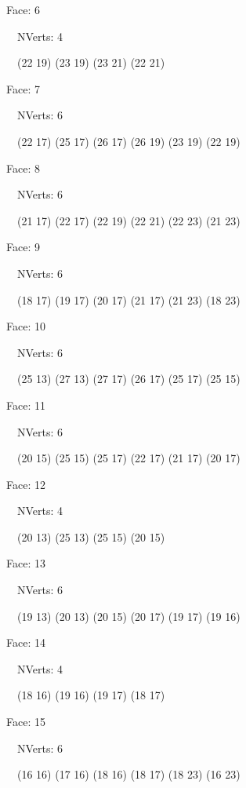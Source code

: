 \documentclass{article}
\begin{document}
{\footnotesize 

Face: 6

\   \    NVerts: 4

 \   \   (22 19) (23 19) (23 21) (22 21)}

{\footnotesize 

Face: 7

\   \    NVerts: 6

 \   \   (22 17) (25 17) (26 17) (26 19) (23 19) (22 19)}

{\footnotesize 

Face: 8

\   \    NVerts: 6

 \   \   (21 17) (22 17) (22 19) (22 21) (22 23) (21 23)}

{\footnotesize 

Face: 9

\   \    NVerts: 6

 \   \   (18 17) (19 17) (20 17) (21 17) (21 23) (18 23)}

{\footnotesize 

Face: 10

\   \    NVerts: 6

 \   \   (25 13) (27 13) (27 17) (26 17) (25 17) (25 15)}

{\footnotesize 

Face: 11

\   \    NVerts: 6

 \   \   (20 15) (25 15) (25 17) (22 17) (21 17) (20 17)}

{\footnotesize 

Face: 12

\   \    NVerts: 4

 \   \   (20 13) (25 13) (25 15) (20 15)}

{\footnotesize 

Face: 13

\   \    NVerts: 6

 \   \   (19 13) (20 13) (20 15) (20 17) (19 17) (19 16)}

{\footnotesize 

Face: 14

\   \    NVerts: 4

 \   \   (18 16) (19 16) (19 17) (18 17)}

{\footnotesize 

Face: 15

\   \    NVerts: 6

 \   \   (16 16) (17 16) (18 16) (18 17) (18 23) (16 23)}
\end{document}
